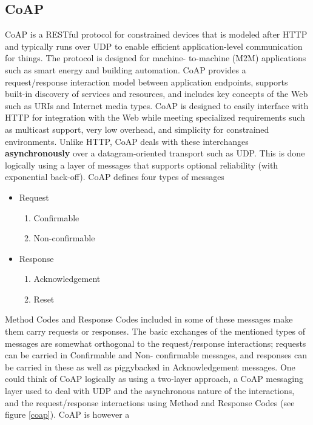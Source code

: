 \documentclass[10pt,journal,compsoc]{IEEEtran}
\begin{document}
	\subsection{\textbf{CoAP}}\label{coapprotocol}
	\cite{rfc7252}CoAP is a RESTful protocol
	for constrained devices that is modeled after HTTP and typically runs
	over UDP to enable efficient application-level communication for
	things. The protocol is designed for machine-
	to-machine (M2M) applications such as smart energy and building
	automation. CoAP provides a request/response interaction model between
	application endpoints, supports built-in discovery of services and
	resources, and includes key concepts of the Web such as URIs and
	Internet media types.  CoAP is designed to easily interface with HTTP
	for integration with the Web while meeting specialized requirements
	such as multicast support, very low overhead, and simplicity for
	constrained environments.  Unlike HTTP, CoAP deals with these interchanges \textbf{asynchronously} over a
	datagram-oriented transport such as UDP.  This is done logically
	using a layer of messages that supports optional reliability (with
	exponential back-off)\cite{rfc7252}.  CoAP defines four types of messages
	\begin{itemize}
		\item Request
		\begin{enumerate}
			\item Confirmable
			\item Non-confirmable
		\end{enumerate}
		\item Response
		\begin{enumerate}
			\item Acknowledgement
			\item Reset
		\end{enumerate}


	\end{itemize}
	\cite{rfc7252}Method Codes and Response Codes included in some of these messages make them carry
	requests or responses. The basic exchanges of the mentioned types of
	messages are somewhat orthogonal to the request/response
	interactions; requests can be carried in Confirmable and Non-
	confirmable messages, and responses can be carried in these as well
	as piggybacked in Acknowledgement messages. One could think of CoAP logically as using a two-layer approach, a
CoAP messaging layer used to deal with UDP and the asynchronous
	nature of the interactions, and the request/response interactions
	using Method and Response Codes (see figure \ref{coap}).  CoAP is however a
\end{document}
